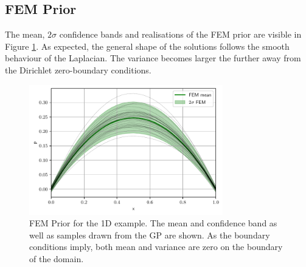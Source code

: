 \documentclass[%
  a4paper,oneside,%
  11pt,%
  smallchapters,
  style=printdev,
  extramargin,
  green,%
  rgb, <cmyk>
  ]{tubsbook}
\begin{document}
\subsection{FEM Prior}
The mean, $2\sigma$ confidence bands and realisations of the FEM prior are visible in Figure \ref{fig:FEMGP1D}. As expected, the general shape of the solutions follows the smooth behaviour of the Laplacian. The variance becomes larger the further away from the Dirichlet zero-boundary conditions.
\begin{figure}[!ht]
\includegraphics[width=0.75\textwidth]{pics/1DFEMprior.pdf}
\centering
\caption{FEM Prior for the 1D example. The mean and confidence band as well as samples drawn from the GP are shown. As the boundary conditions imply, both mean and variance are zero on the boundary of the domain.}
\label{fig:FEMGP1D}
\end{figure}
\end{document}
